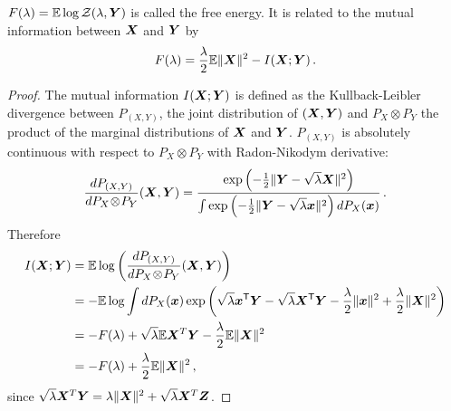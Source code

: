 \documentclass[12pt,nocut]{article}
\begin{document}
\begin{definition}
	$F(\lambda) = \mathbb{E} \log \mathcal{Z}(\lambda,{\boldsymbol Y})$ is called the free energy\footnotemark. It is related to the mutual information between ${\boldsymbol X}$ and ${\boldsymbol Y}$ by
	\begin{equation}\label{eq:f_i}
		F(\lambda) = \frac{\lambda}{2} \mathbb{E} \| {\boldsymbol X} \|^2 - I({\boldsymbol X};{\boldsymbol Y})\,.
	\end{equation}
\end{definition}
\begin{proof}
	The mutual information $I({\boldsymbol X};{\boldsymbol Y})$ is defined as the Kullback-Leibler divergence between $P_{(X,Y)}$, the joint distribution of $({\boldsymbol X},{\boldsymbol Y})$ and $P_X \! \otimes \! P_Y$ the product of the marginal distributions of ${\boldsymbol X}$ and ${\boldsymbol Y}$. $P_{(X,Y)}$ is absolutely continuous with respect to $P_X \otimes P_Y$ with Radon-Nikodym derivative:
	$$
	\frac{d P_{(X,Y)}}{d P_X \! \otimes \! P_Y}({\boldsymbol X},{\boldsymbol Y})
	=
	\frac{\exp\left(-\frac{1}{2}\| {\boldsymbol Y} - \sqrt{\lambda} {\boldsymbol X} \|^2\right)}{\int \exp\left(-\frac{1}{2}\| {\boldsymbol Y} - \sqrt{\lambda} {\boldsymbol x} \|^2\right) dP_X({\boldsymbol x})} \,.
	$$
	Therefore
	\begin{align*}
		I({\boldsymbol X};{\boldsymbol Y}) 
		&= \mathbb{E} \log\left( \frac{d P_{(X,Y)}}{d P_X \!\otimes \!P_Y}({\boldsymbol X},{\boldsymbol Y}) \right)\\
		&= - \mathbb{E} \log \int dP_X({\boldsymbol x}) \exp \left( \sqrt{\lambda} {\boldsymbol x}^{{\sf T}} {\boldsymbol Y} - \sqrt{\lambda} {\boldsymbol X}^{{\sf T}} {\boldsymbol Y} - \frac{\lambda}{2} \|{\boldsymbol x}\|^2 + \frac{\lambda}{2}\|{\boldsymbol X}\|^2 \right)
		\\
                &= -F(\lambda) +\sqrt{\lambda}\mathbb{E} {\boldsymbol X}^T{\boldsymbol Y} - \frac{\lambda}{2} \mathbb{E} \|{\boldsymbol X} \|^2\\
		&= - F(\lambda) + \frac{\lambda}{2} \mathbb{E} \| {\boldsymbol X} \|^2 \,,
	\end{align*}
since $\sqrt{\lambda}{\boldsymbol X}^T{\boldsymbol Y} = \lambda \|{\boldsymbol X}\|^2 + \sqrt{\lambda}{\boldsymbol X}^T{\boldsymbol Z}$.
\end{proof}
\end{document}
